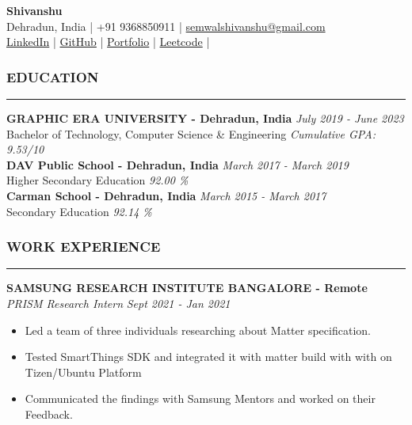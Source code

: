 \documentclass[a4paper]{article}
\begin{document}
\begin{center}
    \textbf{\huge{Shivanshu}} \\
    Dehradun, India |
    +91 9368850911 |
    \href{mailto://semwalshivanshu@gmail.com}{semwalshivanshu@gmail.com}\\
    \href{https://www.linkedin.com/in/shivanshu-semwal/}{LinkedIn} |
    \href{https://github.com/shivanshu-semwal}{GitHub} |
    \href{https://shivanshu-semwal.github.io/}{Portfolio} |
    \href{https://leetcode.com/semwalshivanshu/}{Leetcode} |
\end{center}

\subsubsection*{EDUCATION}
\hrule
\vspace{10pt}

\noindent
\textbf{GRAPHIC ERA UNIVERSITY - Dehradun, India} \hfill  \textit{July 2019 - June 2023} \\
Bachelor of Technology, Computer Science \& Engineering \hfill \textit{Cumulative GPA: 9.53/10} \\

\noindent
\textbf{DAV Public School - Dehradun, India} \hfill \textit{March 2017 - March 2019} \\
Higher Secondary Education \hfill \textit{92.00 \%} \\

\noindent
\textbf{Carman School - Dehradun, India} \hfill \textit{March 2015 - March 2017} \\
Secondary Education \hfill \textit{92.14 \%}

\subsubsection*{WORK EXPERIENCE}
\hrule
\vspace{10pt}

\noindent
\textbf{SAMSUNG RESEARCH INSTITUTE BANGALORE - Remote} \\
\textit{PRISM Research Intern} \hfill \textit{Sept 2021 - Jan 2021}
\begin{itemize} [leftmargin=*,nosep]
    \item Led a team of three individuals researching about Matter specification.
    \item Tested SmartThings SDK and integrated it with matter build with with on Tizen/Ubuntu Platform
    \item Communicated the findings with Samsung Mentors and worked on their Feedback.
\end{itemize}
\end{document}
